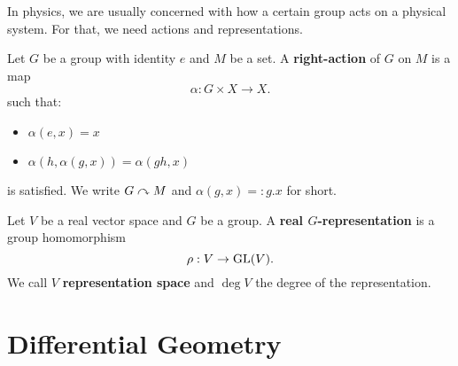 In physics, we are usually concerned with how a certain group acts on a physical system. For that, we need actions and representations.
\begin{definition}
    Let $G$ be a group with identity $e$ and $M$ be a set. A \textbf{right-action} of $G$ on $M$ is a map \[
    \alpha: G \times X \to X
    .\] 
    such that:
    \begin{itemize}
        \item $\alpha(e,x) = x$
        \item $\alpha(h, \alpha(g,x))=\alpha(gh,x)$
    \end{itemize}
    is satisfied. We write $G \curvearrowright M$ and $\alpha(g,x)=:g.x$ for short.
\end{definition}
\begin{definition}[Representation]
    Let $V$ be a real vector space and $G$ be a group. A \textbf{real $G$-representation} is a group homomorphism \[
    \rho: V \to \operatorname{GL}(V)
    .\] 
    We call $V$ \textbf{representation space} and $\deg V$ the degree of the representation.
    
\end{definition}
\section{Differential Geometry}
